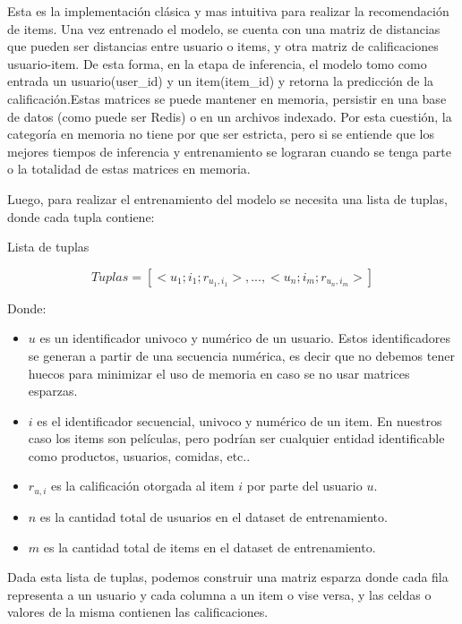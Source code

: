 \documentclass[11pt,a4paper,twoside]{thesis}
\begin{document}
Esta es la implementación clásica y mas intuitiva para realizar la recomendación de items. Una vez entrenado el modelo, se cuenta con una matriz de distancias que pueden ser distancias entre usuario o items, y otra matriz de calificaciones usuario-item.  De esta forma, en la etapa de inferencia, el  modelo tomo como entrada un usuario(user\_id) y un item(item\_id) y retorna la predicción de la calificación.Estas matrices se puede mantener en memoria, persistir en una base de datos (como puede ser Redis) o en un archivos indexado. Por esta cuestión, la categoría en memoria no tiene por que ser estricta, pero si se entiende que los mejores tiempos de inferencia y entrenamiento se lograran cuando se tenga parte o la totalidad de estas matrices en memoria. 

\clearpage
Luego, para realizar el entrenamiento del modelo se necesita una lista de tuplas, donde cada tupla contiene:

\begin{description}
	\item[Lista de tuplas]
\end{description}
\begin{equation*}
	Tuplas = [<u_1; i_1; r_{u_1, i_1}>,...,<u_n; i_m; r_{u_n, i_m}>]
\end{equation*}
\begin{description}
	\item[Donde:]
\end{description}
\begin{itemize}
	\item $u$ es un identificador univoco y numérico de un usuario. Estos identificadores se generan a partir de una secuencia numérica, es decir que no debemos tener huecos para minimizar el uso de memoria en caso se no usar matrices esparzas. 
	\item $i$ es el identificador secuencial, univoco y numérico de un item. En nuestros caso los items son películas, pero podrían ser cualquier entidad identificable como productos, usuarios, comidas, etc.. 
	\item $r_{u, i}$ es la calificación otorgada al item $i$ por parte del usuario $u$. 
 	\item $n$ es la cantidad total de usuarios en el dataset de entrenamiento. 
  	\item $m$ es la cantidad total de items en el dataset de entrenamiento. 
\end{itemize}

Dada esta lista de tuplas, podemos construir una matriz esparza donde cada fila representa a un usuario y cada columna a un item o vise versa, y 
las celdas o valores de la misma contienen las calificaciones.
\end{document}
